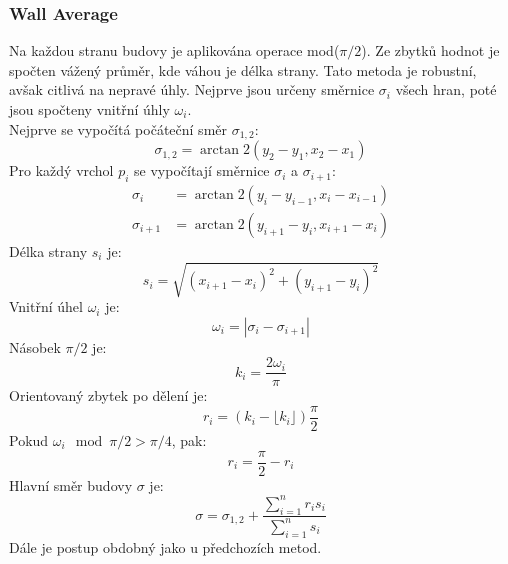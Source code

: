 \subsubsection{Wall Average}
Na každou stranu budovy je aplikována operace mod($\pi/2$). Ze zbytků hodnot je spočten vážený průměr, kde váhou je délka strany. Tato metoda je robustní, avšak citlivá na nepravé úhly. Nejprve jsou určeny směrnice $\sigma_i$ všech hran, poté jsou spočteny vnitřní úhly $\omega_i$.\\
Nejprve se vypočítá počáteční směr $\sigma_{1,2}$:
\begin{equation}
    \sigma_{1,2} = \arctan2(y_2 - y_1, x_2 - x_1)
\end{equation}
Pro každý vrchol $p_i$ se vypočítají směrnice $\sigma_i$ a $\sigma_{i+1}$:
\begin{align}
    \sigma_i &= \arctan2(y_i - y_{i-1}, x_i - x_{i-1}) \\
    \sigma_{i+1} &= \arctan2(y_{i+1} - y_i, x_{i+1} - x_i)
\end{align}
Délka strany $s_i$ je:
\begin{equation}
    s_i = \sqrt{(x_{i+1} - x_i)^2 + (y_{i+1} - y_i)^2}
\end{equation}
Vnitřní úhel $\omega_i$ je:
\begin{equation}
    \omega_i = |\sigma_i - \sigma_{i+1}|
\end{equation}
Násobek $\pi/2$ je:
\begin{equation}
    k_i = \frac{2\omega_i}{\pi}
\end{equation}
Orientovaný zbytek po dělení je:
\begin{equation}
    r_i = (k_i - \lfloor k_i \rfloor) \frac{\pi}{2}
\end{equation}
Pokud $\omega_i \mod \pi/2 > \pi/4$, pak:
\begin{equation}
    r_i = \frac{\pi}{2} - r_i
\end{equation}
Hlavní směr budovy $\sigma$ je:
\begin{equation}
    \sigma = \sigma_{1,2} + \frac{\sum_{i=1}^{n} r_i s_i}{\sum_{i=1}^{n} s_i}
\end{equation}
Dále je postup obdobný jako u předchozích metod.



